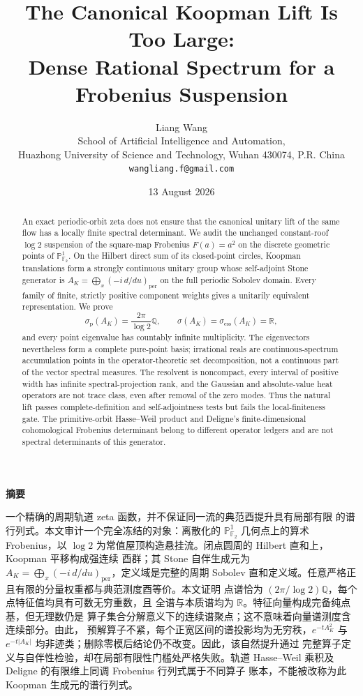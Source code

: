 \documentclass[11pt]{article}
\title{\textbf{The Canonical Koopman Lift Is Too Large:}\\
Dense Rational Spectrum for a Frobenius Suspension}
\author{Liang Wang\\
\small School of Artificial Intelligence and Automation,\\[-2pt]
\small Huazhong University of Science and Technology, Wuhan 430074, P.R. China\\
\small \texttt{wangliang.f@gmail.com}}
\date{13 August 2026}
\theoremstyle{definition}
\theoremstyle{remark}
\begin{document}
\maketitle

\begin{abstract}
An exact periodic-orbit zeta does not ensure that the canonical unitary lift
of the same flow has a locally finite spectral determinant.  We audit the
unchanged constant-roof \(\log2\) suspension of the square-map Frobenius
\(F(a)=a^2\) on the discrete geometric points of
\(\mathbb P^1_{\mathbb F_2}\).  On the Hilbert
direct sum of its closed-point circles, Koopman translations form a strongly
continuous unitary group whose self-adjoint Stone generator is
\(A_K=\bigoplus_x(-i\,d/du)_{\mathrm{per}}\) on the full periodic Sobolev
domain.  Every family of finite, strictly positive component weights gives a
unitarily equivalent representation.  We prove
\[
 \sigma_{\mathrm p}(A_K)=\frac{2\pi}{\log2}\mathbb Q,
 \qquad
 \sigma(A_K)=\sigma_{\mathrm{ess}}(A_K)=\mathbb R,
\]
and every point eigenvalue has countably infinite multiplicity.  The
eigenvectors nevertheless form a complete pure-point basis; irrational reals
are continuous-spectrum accumulation points in the operator-theoretic set
decomposition, not a continuous part of the vector spectral measures.  The
resolvent is noncompact, every interval of positive width has infinite
spectral-projection rank, and the Gaussian and absolute-value heat operators
are not trace class, even after removal of the zero modes.  Thus the natural
lift passes complete-definition and self-adjointness tests but fails the
local-finiteness gate.  The primitive-orbit Hasse--Weil product and Deligne's
finite-dimensional cohomological Frobenius determinant belong to different
operator ledgers and are not spectral determinants of this generator.
\end{abstract}

\ifPDFTeX\else
\begin{center}
{\zhfont\bfseries 摘要}
\end{center}
{\zhfont
一个精确的周期轨道 zeta 函数，并不保证同一流的典范酉提升具有局部有限
的谱行列式。本文审计一个完全冻结的对象：离散化的
\(\mathbb P^1_{\mathbb F_2}\) 几何点上的算术 Frobenius，以 \(\log2\)
为常值屋顶构造悬挂流。闭点圆周的 Hilbert 直和上，Koopman 平移构成强连续
酉群；其 Stone 自伴生成元为
\(A_K=\bigoplus_x(-i\,d/du)_{\mathrm{per}}\)，定义域是完整的周期 Sobolev
直和定义域。任意严格正且有限的分量权重都与典范测度酉等价。本文证明
点谱恰为 \((2\pi/\log2)\mathbb Q\)，每个点特征值均具有可数无穷重数，且
全谱与本质谱均为 \(\mathbb R\)。特征向量构成完备纯点基，但无理数仍是
算子集合分解意义下的连续谱聚点；这不意味着向量谱测度含连续部分。由此，
预解算子不紧，每个正宽区间的谱投影均为无穷秩，\(e^{-tA_K^2}\) 与
\(e^{-t|A_K|}\) 均非迹类；删除零模后结论仍不改变。因此，该自然提升通过
完整算子定义与自伴性检验，却在局部有限性门槛处严格失败。轨道
Hasse--Weil 乘积及 Deligne 的有限维上同调 Frobenius 行列式属于不同算子
账本，不能被改称为此 Koopman 生成元的谱行列式。
}
\fi
\end{document}
